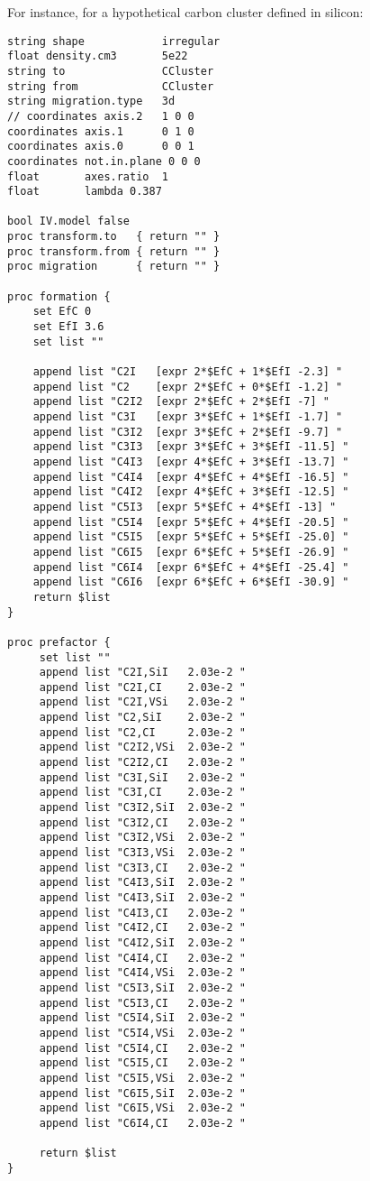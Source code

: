 For instance, for a hypothetical carbon cluster defined in silicon:

\begin{lstlisting}        
string shape           	irregular
float density.cm3      	5e22
string to    			CCluster
string from  			CCluster
string migration.type	3d
// coordinates axis.2   1 0 0
coordinates axis.1     	0 1 0 
coordinates axis.0     	0 0 1
coordinates not.in.plane 0 0 0
float       axes.ratio 	1
float       lambda 0.387

bool IV.model false
proc transform.to   { return "" }
proc transform.from { return "" }
proc migration      { return "" }

proc formation {
    set EfC 0
    set EfI 3.6
    set list ""
    
    append list "C2I   [expr 2*$EfC + 1*$EfI -2.3] "
    append list "C2    [expr 2*$EfC + 0*$EfI -1.2] "
    append list "C2I2  [expr 2*$EfC + 2*$EfI -7] "
    append list "C3I   [expr 3*$EfC + 1*$EfI -1.7] "
    append list "C3I2  [expr 3*$EfC + 2*$EfI -9.7] "
    append list "C3I3  [expr 3*$EfC + 3*$EfI -11.5] "
    append list "C4I3  [expr 4*$EfC + 3*$EfI -13.7] "
    append list "C4I4  [expr 4*$EfC + 4*$EfI -16.5] "
    append list "C4I2  [expr 4*$EfC + 3*$EfI -12.5] "
    append list "C5I3  [expr 5*$EfC + 4*$EfI -13] "
    append list "C5I4  [expr 5*$EfC + 4*$EfI -20.5] "
    append list "C5I5  [expr 5*$EfC + 5*$EfI -25.0] "
    append list "C6I5  [expr 6*$EfC + 5*$EfI -26.9] "
    append list "C6I4  [expr 6*$EfC + 4*$EfI -25.4] "
    append list "C6I6  [expr 6*$EfC + 6*$EfI -30.9] "
    return $list
}

proc prefactor {
     set list ""
     append list "C2I,SiI   2.03e-2 "
     append list "C2I,CI    2.03e-2 "
     append list "C2I,VSi   2.03e-2 "
     append list "C2,SiI    2.03e-2 "
     append list "C2,CI     2.03e-2 "
     append list "C2I2,VSi  2.03e-2 "
     append list "C2I2,CI   2.03e-2 "
     append list "C3I,SiI   2.03e-2 "
     append list "C3I,CI    2.03e-2 "
     append list "C3I2,SiI  2.03e-2 "
     append list "C3I2,CI   2.03e-2 "
     append list "C3I2,VSi  2.03e-2 "
     append list "C3I3,VSi  2.03e-2 "
     append list "C3I3,CI   2.03e-2 "
     append list "C4I3,SiI  2.03e-2 "
     append list "C4I3,SiI  2.03e-2 "
     append list "C4I3,CI   2.03e-2 "
     append list "C4I2,CI   2.03e-2 "
     append list "C4I2,SiI  2.03e-2 "
     append list "C4I4,CI   2.03e-2 "
     append list "C4I4,VSi  2.03e-2 "
     append list "C5I3,SiI  2.03e-2 "
     append list "C5I3,CI   2.03e-2 "
     append list "C5I4,SiI  2.03e-2 "
     append list "C5I4,VSi  2.03e-2 "
     append list "C5I4,CI   2.03e-2 "
     append list "C5I5,CI   2.03e-2 "
     append list "C5I5,VSi  2.03e-2 "
     append list "C6I5,SiI  2.03e-2 "
     append list "C6I5,VSi  2.03e-2 "
     append list "C6I4,CI   2.03e-2 "
	
     return $list
}
\end{lstlisting}

